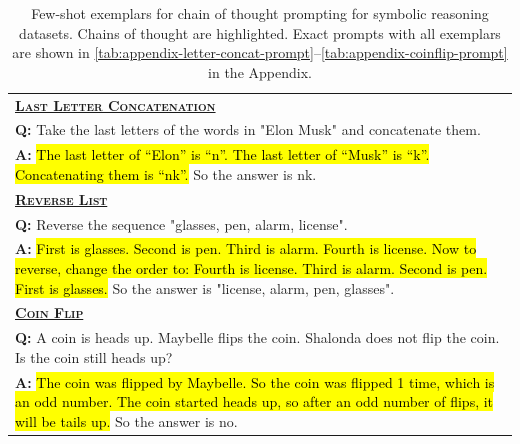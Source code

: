 \begingroup
\begin{table}[t]
    \caption{
    Few-shot exemplars for chain of thought prompting for symbolic reasoning datasets.
    Chains of thought are highlighted.
    Exact prompts with all exemplars are shown in \cref{tab:appendix-letter-concat-prompt}--\cref{tab:appendix-coinflip-prompt} in the Appendix.
    }
    \centering
    \small
    \begin{tabular}{p{\linewidth}}
        
        \toprule
        \underline{\textbf{\textsc{Last Letter Concatenation}}} \\
        \vspace{-2mm}
        \textbf{Q:} Take the last letters of the words in "Elon Musk" and concatenate them. \\
        \vspace{-1mm}
        \textbf{A:} \hl{The last letter of ``Elon'' is ``n''. The last letter of ``Musk'' is ``k''. Concatenating them is ``nk''.} So the answer is nk. \\
        \midrule
        \underline{\textbf{\textsc{Reverse List}}} \\
        \vspace{-2mm}
        \textbf{Q:} Reverse the sequence "glasses, pen, alarm, license". \\
        \vspace{-1mm}
        \textbf{A:} \hl{First is glasses. Second is pen. Third is alarm. Fourth is license. Now to reverse, change the order to: Fourth is license. Third is alarm. Second is pen. First is glasses.} So the answer is "license, alarm, pen, glasses". \\ 
        \midrule
        \underline{\textbf{\textsc{Coin Flip}}} \\
        \vspace{-2mm}
        \textbf{Q:} A coin is heads up. Maybelle flips the coin. Shalonda does not flip the coin. Is the coin still heads up? \\
        \vspace{-1mm}
        \textbf{A:} \hl{The coin was flipped by Maybelle. So the coin was flipped 1 time, which is an odd number. The coin started heads up, so after an odd number of flips, it will be tails up.} So the answer is no. \\
        \bottomrule
    \end{tabular}
    \label{tab:symbolic-datasets}
    \vspace{-3mm}
\end{table}
\endgroup
